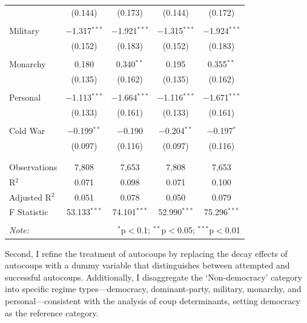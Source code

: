 \documentclass[
  12pt,
]{report}
\begin{document}
\begin{table}
{\begin{tabular}{@{\extracolsep{20pt}}lcccc}
  & (0.144) & (0.173) & (0.144) & (0.172) \\ 
  & & & & \\ 
 \hspace{1.5cm} Military & $-$1.317$^{***}$ & $-$1.921$^{***}$ & $-$1.315$^{***}$ & $-$1.924$^{***}$ \\ 
  & (0.152) & (0.183) & (0.152) & (0.183) \\ 
  & & & & \\ 
 \hspace{1.5cm} Monarchy & 0.180 & 0.340$^{**}$ & 0.195 & 0.355$^{**}$ \\ 
  & (0.135) & (0.162) & (0.135) & (0.162) \\ 
  & & & & \\ 
 \hspace{1.5cm} Personal & $-$1.113$^{***}$ & $-$1.664$^{***}$ & $-$1.116$^{***}$ & $-$1.671$^{***}$ \\ 
  & (0.133) & (0.161) & (0.133) & (0.161) \\ 
  & & & & \\ 
 Cold War & $-$0.199$^{**}$ & $-$0.190 & $-$0.204$^{**}$ & $-$0.197$^{*}$ \\ 
  & (0.097) & (0.116) & (0.097) & (0.116) \\ 
  & & & & \\ 
\hline \\[-1.8ex] 
Observations & 7,808 & 7,653 & 7,808 & 7,653 \\ 
R$^{2}$ & 0.071 & 0.098 & 0.071 & 0.100 \\ 
Adjusted R$^{2}$ & 0.051 & 0.078 & 0.050 & 0.079 \\ 
F Statistic & 53.133$^{***}$ & 74.101$^{***}$ & 52.990$^{***}$ & 75.296$^{***}$ \\ 
\hline 
\hline \\[-1.8ex] 
\textit{Note:}  & \multicolumn{4}{r}{$^{*}$p$<$0.1; $^{**}$p$<$0.05; $^{***}$p$<$0.01} \\ 
\end{tabular}

}

\end{table}%

Second, I refine the treatment of autocoups by replacing the decay
effects of autocoups with a dummy variable that distinguishes between
attempted and successful autocoups. Additionally, I disaggregate the
`Non-democracy' category into specific regime types---democracy,
dominant-party, military, monarchy, and personal---consistent with the
analysis of coup determinants, setting democracy as the reference
category.
\end{document}
